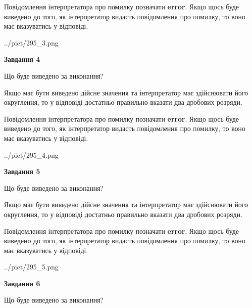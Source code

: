 \documentclass[12pt, ukrainian]{article}
\begin{document}
{\begin {Large}
Повідомлення інтерпретатора про помилку позначати \textbf{error}.
Якщо щось буде виведено до того, як інтерпретатор видасть повідомлення про помилку, 
то воно має вказуватись у відповіді. \par

\begin{center}
	{../pict/295_3.png}
\end{center}
\newpage

{\begin {center}\textbf{Завдання 4}\end {center}}\par
Що буде виведено за виконання? \par

Якщо має бути виведено дійсне значення та інтерпретатор має здійснювати його округлення, 
то у відповіді достатньо правильно вказати два дробових розряди.

Повідомлення інтерпретатора про помилку позначати \textbf{error}.
Якщо щось буде виведено до того, як інтерпретатор видасть повідомлення про помилку, 
то воно має вказуватись у відповіді. \par

\begin{center}
	{../pict/295_4.png}
\end{center}
\newpage

{\begin {center}\textbf{Завдання 5}\end {center}}\par
Що буде виведено за виконання? \par

Якщо має бути виведено дійсне значення та інтерпретатор має здійснювати його округлення, 
то у відповіді достатньо правильно вказати два дробових розряди.

Повідомлення інтерпретатора про помилку позначати \textbf{error}.
Якщо щось буде виведено до того, як інтерпретатор видасть повідомлення про помилку, 
то воно має вказуватись у відповіді. \par

\begin{center}
	{../pict/295_5.png}
\end{center}
\newpage

{\begin {center}\textbf{Завдання 6}\end {center}}\par
Що буде виведено за виконання? \par


\end{Large}}
\end{document}

